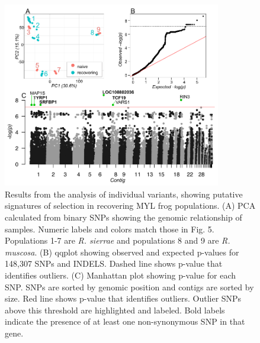 \documentclass[9pt,twoside,lineno]{pnas-new-SI}
\begin{document}
\begin{figure}

{\centering \includegraphics[width=0.85\textwidth]{figures/pca_qq_manhattan.png}

}

\caption{\label{fig-selectionresults}Results from the analysis of
individual variants, showing putative signatures of selection in
recovering MYL frog populations. (A) PCA calculated from binary SNPs
showing the genomic relationship of samples. Numeric labels and colors
match those in Fig. 5. Populations 1-7 are
\emph{R. sierrae} and populations 8 and 9 are \emph{R. muscosa}. (B)
qqplot showing observed and expected p-values for 148,307 SNPs and
INDELS. Dashed line shows p-value that identifies outliers. (C)
Manhattan plot showing p-value for each SNP. SNPs are sorted by genomic
position and contigs are sorted by size. Red line shows p-value that
identifies outliers. Outlier SNPs above this threshold are highlighted
and labeled. Bold labels indicate the presence of at least one
non-synonymous SNP in that gene.}

\end{figure}\clearpage

\newpage
\end{document}
